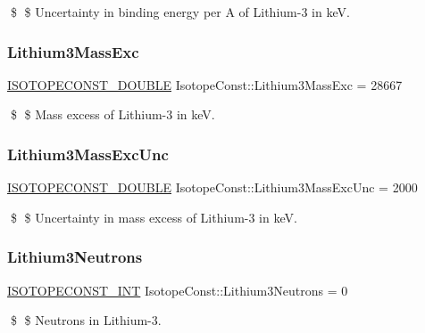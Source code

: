 \$ \$ Uncertainty in binding energy per A of Lithium-\/3 in keV. \mbox{\label{group___isotope_const-_lithium-_li3_ga8d35c645d7a3b07c88af3596f92a0f4d}} 
\subsubsection{\texorpdfstring{Lithium3\+Mass\+Exc}{Lithium3MassExc}}
{\footnotesize\ttfamily \mbox{\hyperlink{group___isotope_const-_macros_ga8f45a7272ce02c0b4c65c44636ed719a}{I\+S\+O\+T\+O\+P\+E\+C\+O\+N\+S\+T\+\_\+\+D\+O\+U\+B\+LE}} Isotope\+Const\+::\+Lithium3\+Mass\+Exc = 28667}

\$ \$ Mass excess of Lithium-\/3 in keV. \mbox{\label{group___isotope_const-_lithium-_li3_ga1f8f6b1de6f31a5d5f33adbf8ddd00c4}} 
\subsubsection{\texorpdfstring{Lithium3\+Mass\+Exc\+Unc}{Lithium3MassExcUnc}}
{\footnotesize\ttfamily \mbox{\hyperlink{group___isotope_const-_macros_ga8f45a7272ce02c0b4c65c44636ed719a}{I\+S\+O\+T\+O\+P\+E\+C\+O\+N\+S\+T\+\_\+\+D\+O\+U\+B\+LE}} Isotope\+Const\+::\+Lithium3\+Mass\+Exc\+Unc = 2000}

\$ \$ Uncertainty in mass excess of Lithium-\/3 in keV. \mbox{\label{group___isotope_const-_lithium-_li3_ga65f2b9e8099b1b60f604befb2979ba21}} 
\subsubsection{\texorpdfstring{Lithium3\+Neutrons}{Lithium3Neutrons}}
{\footnotesize\ttfamily \mbox{\hyperlink{group___isotope_const-_macros_ga5f18360b3e99483a35c32d789e62621c}{I\+S\+O\+T\+O\+P\+E\+C\+O\+N\+S\+T\+\_\+\+I\+NT}} Isotope\+Const\+::\+Lithium3\+Neutrons = 0}

\$ \$ Neutrons in Lithium-\/3. \mbox{\label{group___isotope_const-_lithium-_li3_gaa02b6b7e8aaa4a8a44fbc10b84e3760d}} 
